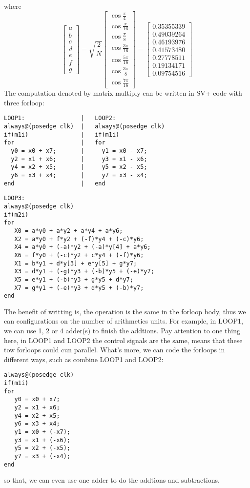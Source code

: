 where \[ \left[ \begin{array}{lllllll}
a \\ b \\ c \\ d \\ e \\ f \\ g
\end{array}
\right]  = \sqrt{\frac{2}{N}} \left[ \begin{array}{lllllll}
\cos\frac{\pi}{4} \\ \cos\frac{\pi}{16} \\ \cos\frac{\pi}{8} \\
\cos\frac{3\pi}{16} \\ \cos\frac{5\pi}{16} \\ \cos\frac{3\pi}{8} \\
\cos\frac{7\pi}{16}
\end{array}
\right] = \left[ \begin{array}{lllllll}
0.35355339 \\ 0.49039264 \\ 0.46193976 \\ 0.41573480 \\
0.27778511 \\ 0.19134171 \\ 0.09754516
\end{array}
\right]
\]
The computation denoted by matrix multiply can be written in SV+ code with three forloop:
\begin{verbatim}
LOOP1:                |   LOOP2:
always@(posedge clk)  |   always@(posedge clk)
if(m1i)               |   if(m1i)
for                   |   for
  y0 = x0 + x7;       |     y1 = x0 - x7;
  y2 = x1 + x6;       |     y3 = x1 - x6;
  y4 = x2 + x5;       |     y5 = x2 - x5;
  y6 = x3 + x4;       |     y7 = x3 - x4;
end                   |   end
\end{verbatim}
\begin{verbatim}
LOOP3:
always@(posedge clk)
if(m2i)
for
   X0 = a*y0 + a*y2 + a*y4 + a*y6;
   X2 = a*y0 + f*y2 + (-f)*y4 + (-c)*y6;
   X4 = a*y0 + (-a)*y2 + (-a)*y[4] + a*y6;
   X6 = f*y0 + (-c)*y2 + c*y4 + (-f)*y6;
   X1 = b*y1 + d*y[3] + e*y[5] + g*y7;
   X3 = d*y1 + (-g)*y3 + (-b)*y5 + (-e)*y7;
   X5 = e*y1 + (-b)*y3 + g*y5 + d*y7;
   X7 = g*y1 + (-e)*y3 + d*y5 + (-b)*y7;
end
\end{verbatim}
The benefit of writting is, the operation is the same in the forloop body, thus we can configurations on the number of arithmetics units. For example, in LOOP1, we can use 1, 2 or 4 adder(s) to finish the addtions. Pay attention to one thing here, in LOOP1 and LOOP2 the control signals are the same, means that these tow forloops could cun parallel. What's more, we can code the forloops in different ways, such as combine LOOP1 and LOOP2:
\begin{verbatim}
always@(posedge clk)
if(m1i)
for
   y0 = x0 + x7;
   y2 = x1 + x6;
   y4 = x2 + x5;
   y6 = x3 + x4;
   y1 = x0 + (-x7);
   y3 = x1 + (-x6);
   y5 = x2 + (-x5);
   y7 = x3 + (-x4);
end
\end{verbatim}
so that, we can even use one adder to do the addtions and subtractions.
